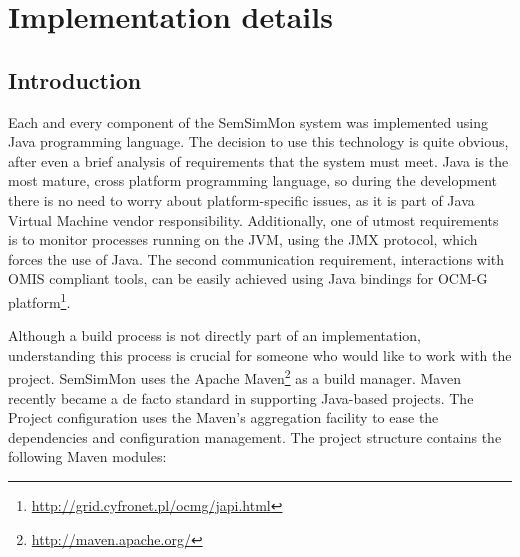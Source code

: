%
\chapter{Implementation details}
\label{cha:implementation}



\section{Introduction}

Each and every component of the SemSimMon system was implemented using Java programming language. The decision to use this technology is quite obvious, after even a brief analysis of requirements that the system must meet. Java is the most mature, cross platform programming language, so during the development there is no need to worry about platform-specific issues, as it is part of Java Virtual Machine vendor responsibility. Additionally, one of utmost requirements is to monitor processes running on the JVM, using the JMX protocol, which forces the use of Java. The second communication requirement, interactions with OMIS compliant tools, can be easily achieved using Java bindings for OCM-G platform\footnote{\url{http://grid.cyfronet.pl/ocmg/japi.html}}.

Although a build process is not directly part of an implementation, understanding this process is crucial for someone who would like to work with the project. SemSimMon uses the Apache Maven\footnote{\url{http://maven.apache.org/}} as a build manager. Maven recently became a de facto standard in supporting Java-based projects. The Project configuration uses the Maven's aggregation facility to ease the dependencies and configuration management. The project structure contains the following Maven modules: 

